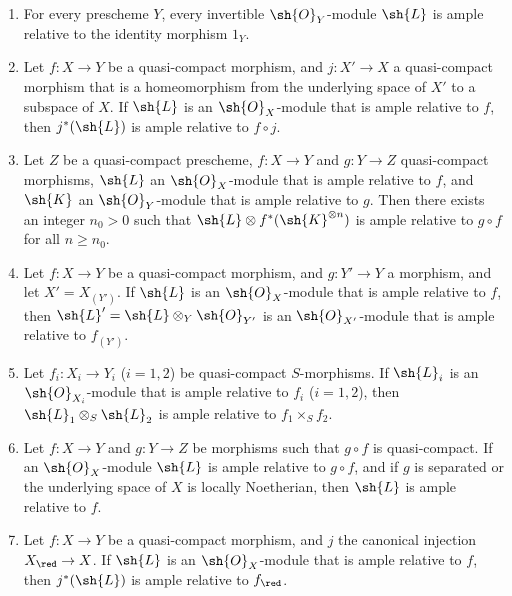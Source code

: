 \begin{proposition}[4.6.13]
\label{II.4.6.13}
\begin{enumerate}
  \item[\rm{(i)}] For every prescheme $Y$, every invertible $\sh{O}_Y$-module $\sh{L}$ is ample relative to the identity morphism $1_Y$.
  \item[\rm{(i \emph{bis})}] Let $f:X\to Y$ be a quasi-compact morphism, and $j:X'\to X$ a quasi-compact morphism that is a homeomorphism from the underlying space of $X'$ to a subspace of $X$.
    If $\sh{L}$ is an $\sh{O}_X$-module that is ample relative to $f$, then $j^*(\sh{L})$ is ample relative to $f\circ j$.
  \item[\rm{(ii)}] Let $Z$ be a quasi-compact prescheme, $f:X\to Y$ and $g:Y\to Z$ quasi-compact morphisms, $\sh{L}$ an $\sh{O}_X$-module that is ample relative to $f$, and $\sh{K}$ an $\sh{O}_Y$-module that is ample relative to $g$.
    Then there exists an integer $n_0>0$ such that $\sh{L}\otimes f^*(\sh{K}^{\otimes n})$ is ample relative to $g\circ f$ for all $n\geq n_0$.
  \item[\rm{(iii)}] Let $f:X\to Y$ be a quasi-compact morphism, and $g:Y'\to Y$ a morphism, and let $X'=X_{(Y')}$.
    If $\sh{L}$ is an $\sh{O}_X$-module that is ample relative to $f$, then $\sh{L}'=\sh{L}\otimes_Y\sh{O}_{Y'}$ is an $\sh{O}_{X'}$-module that is ample relative to $f_{(Y')}$.
  \item[\rm{(iv)}] Let $f_i:X_i\to Y_i$ ($i=1,2$) be quasi-compact $S$-morphisms.
    If $\sh{L}_i$ is an $\sh{O}_{X_i}$-module that is ample relative to $f_i$ ($i=1,2$), then $\sh{L}_1\otimes_S\sh{L}_2$ is ample relative to $f_1\times_S f_2$.
  \item[\rm{(v)}] Let $f:X\to Y$ and $g:Y\to Z$ be morphisms such that $g\circ f$ is quasi-compact.
    If an
    $\sh{O}_X$-module $\sh{L}$ is ample relative to $g\circ f$, and if $g$ is separated or the underlying space of $X$ is locally Noetherian, then $\sh{L}$ is ample relative to $f$.
  \item[\rm{(vi)}] Let $f:X\to Y$ be a quasi-compact morphism, and $j$ the canonical injection $X_\red\to X$.
    If $\sh{L}$ is an $\sh{O}_X$-module that is ample relative to $f$, then $j^*(\sh{L})$ is ample relative to $f_\red$.
\end{enumerate}
\end{proposition}

